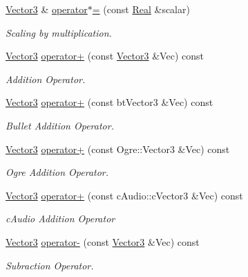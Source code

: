 \begin{DoxyCompactItemize}
\hyperlink{classMezzanine_1_1Vector3}{Vector3} \& \hyperlink{classMezzanine_1_1Vector3_a5e99a6ae8870ca12aa7e6e58bffef0c5}{operator$\ast$=} (const \hyperlink{namespaceMezzanine_a726731b1a7df72bf3583e4a97282c6f6}{Real} \&scalar)
\begin{DoxyCompactList}\small\item\em Scaling by multiplication. \item\end{DoxyCompactList}\item 
\hyperlink{classMezzanine_1_1Vector3}{Vector3} \hyperlink{classMezzanine_1_1Vector3_abaadfc0d5848107f4be81fd97eaa932b}{operator+} (const \hyperlink{classMezzanine_1_1Vector3}{Vector3} \&Vec) const 
\begin{DoxyCompactList}\small\item\em Addition Operator. \item\end{DoxyCompactList}\item 
\hyperlink{classMezzanine_1_1Vector3}{Vector3} \hyperlink{classMezzanine_1_1Vector3_ab9093d82a813c4c700daf6d01a66633b}{operator+} (const btVector3 \&Vec) const 
\begin{DoxyCompactList}\small\item\em Bullet Addition Operator. \item\end{DoxyCompactList}\item 
\hyperlink{classMezzanine_1_1Vector3}{Vector3} \hyperlink{classMezzanine_1_1Vector3_a1a11c416872d294739a505c04250d58d}{operator+} (const Ogre::Vector3 \&Vec) const 
\begin{DoxyCompactList}\small\item\em Ogre Addition Operator. \item\end{DoxyCompactList}\item 
\hyperlink{classMezzanine_1_1Vector3}{Vector3} \hyperlink{classMezzanine_1_1Vector3_a1df3f5ceba13194dc744b551fb4ddbc2}{operator+} (const cAudio::cVector3 \&Vec) const 
\begin{DoxyCompactList}\small\item\em cAudio Addition Operator \item\end{DoxyCompactList}\item 
\hyperlink{classMezzanine_1_1Vector3}{Vector3} \hyperlink{classMezzanine_1_1Vector3_acccf60385ca5264212a53c4278918231}{operator-\/} (const \hyperlink{classMezzanine_1_1Vector3}{Vector3} \&Vec) const 
\begin{DoxyCompactList}\small\item\em Subraction Operator. \item\end{DoxyCompactList}\item 

\end{DoxyCompactItemize}
